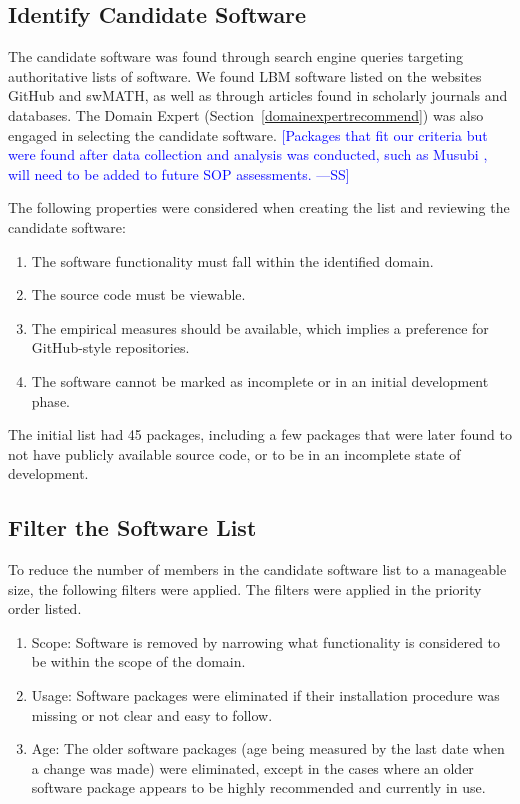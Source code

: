 \documentclass[final, 3p, times, authoryear]{elsarticle}
\newcommand{\authornote}[3]{\textcolor{#1}{[#3 ---#2]}}
\newcommand{\authornote}[3]{}
\newcommand{\wss}[1]{\authornote{blue}{SS}{#1}} %
\begin{document}
\subsection{Identify Candidate Software} \label{identifysoftware}

The candidate software was found through search engine queries targeting
authoritative lists of software. We found LBM software listed on the websites
GitHub and swMATH, as well as through articles found in scholarly journals and
databases.  The Domain Expert (Section~\ref{domainexpertrecommend}) was also
engaged in selecting the candidate software.  \wss{Packages that fit our
criteria but were found after data collection and analysis was conducted, such
as Musubi \citep{HasertEtAl2014}, will need to be added to future SOP
assessments.}

The following properties were considered when creating the list and reviewing
the candidate software:

\begin{enumerate}
	\item The software functionality must fall within the identified domain.
	\item The source code must be viewable.
	\item The empirical measures should be available, which implies a preference
	for GitHub-style repositories.
	\item The software cannot be marked as incomplete or in an initial
	development phase.
\end{enumerate}

The initial list had 45 packages, including a few packages that were later found
to not have publicly available source code, or to be in an incomplete state of
development. 

\subsection{Filter the Software List} \label{filtersoftware}

To reduce the number of members in the candidate software list to a manageable
size, the following filters were applied. The filters were applied in the
priority order listed.

\begin{enumerate}
	\item Scope: Software is removed by narrowing what functionality is
	considered to be within the scope of the domain.
	\item Usage: Software packages were eliminated if their installation
	procedure was missing or not clear and easy to follow.
	\item Age: The older software packages (age being measured by the last date
	when a change was made) were eliminated, except in the cases where an older
	software package appears to be highly recommended and currently in use. 
\end{enumerate}
\end{document}
